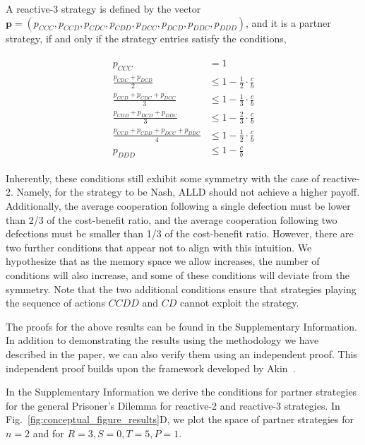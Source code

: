 \documentclass[11pt]{article}
\begin{document}
A reactive-3 strategy is defined by the vector $\mathbf{p} = (p_{CCC}, p_{CCD},
p_{CDC}, p_{CDD}, p_{DCC}, p_{DCD}, p_{DDC}, p_{DDD})$, and it is a partner strategy,
if and only if the strategy entries satisfy the conditions,

\begin{align}\label{eq:three_bit_conditions}
  \begin{split}
  p_{CCC} & = 1 \\
  \frac{p_{CDC} + p_{DCD}}{2} & \leq 1 - \frac{1}{2} \cdot \frac{c}{b} \\
  \frac{p_{CCD} + p_{CDC} + p_{DCC}}{3} & \leq 1 - \frac{1}{3} \cdot \frac{c}{b} \\
  \frac{p_{CDD} + p_{DCD} + p_{DDC}}{3} & \leq 1 - \frac{2}{3} \cdot \frac{c}{b} \\
  \frac{p_{CCD} + p_{CDD} + p_{DCC} + p_{DDC}}{4}  & \leq 1 - \frac{1}{2} \cdot \frac{c}{b}  \\
  p_{DDD} & \leq 1\!-\! \frac{c}{b}
  \end{split}
\end{align}

Inherently, these conditions still exhibit some symmetry with the case of
reactive-2. Namely, for the strategy to be Nash, ALLD should not achieve a
higher payoff. Additionally, the average cooperation following a single
defection must be lower than 2/3 of the cost-benefit ratio, and the average
cooperation following two defections must be smaller than 1/3 of the
cost-benefit ratio. However, there are two further conditions that appear not to
align with this intuition. We hypothesize that as the memory space we allow
increases, the number of conditions will also increase, and some of these
conditions will deviate from the symmetry. Note that the two additional conditions ensure
that strategies playing the sequence of actions $CCDD$ and $CD$ cannot exploit the
strategy.

The proofs for the above results can be found in the Supplementary Information.
In addition to demonstrating the results using the methodology we have described
in the paper, we can also verify them using an independent proof. This
independent proof builds upon the framework developed by
Akin~\cite{akin:EGADS:2016}.

In the Supplementary Information we derive the conditions for partner strategies
for the general Prisoner's Dilemma for reactive-2 and reactive-3 strategies. In
Fig.~\ref{fig:conceptual_figure_results}D, we plot the space of partner
strategies for $n=2$ and for $R =3, S=0, T=5, P=1$.
\end{document}
